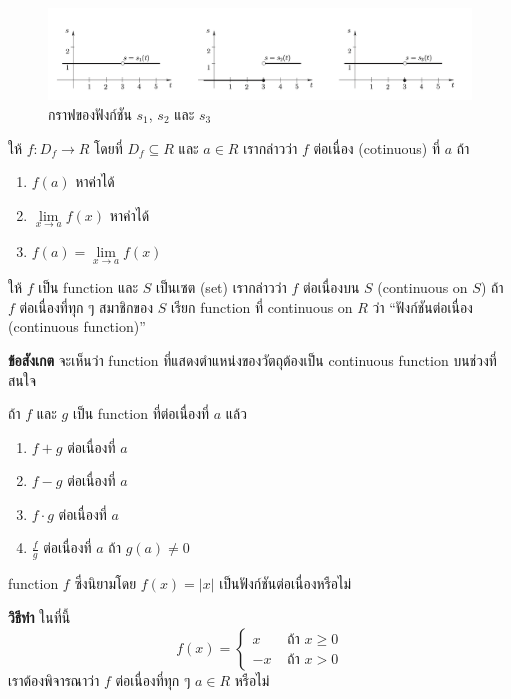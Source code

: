 \documentclass[
]{book}
\begin{document}
\begin{figure}

{\centering \includegraphics[width=0.5\linewidth]{images/fig-continuity-1} 

}

\caption{กราฟของฟังก์ชัน $s_1$, $s_2$ และ $s_3$}\label{fig:fig-continuity-1}
\end{figure}

ให้ \(f:D_{f}\rightarrow R\) โดยที่ \(D_{f}\subseteq R\) และ \(a\in R\)
เรากล่าวว่า \(f\) ต่อเนื่อง (cotinuous) ที่ \(a\) ถ้า

\begin{enumerate}
\def\labelenumi{\arabic{enumi}.}
\item
  \(f \left( a\right)\) หาค่าได้
\item
  \(\underset{x\rightarrow a}{\lim}f(x)\) หาค่าได้
\item
  \(f\left( a\right) =\underset{x\rightarrow a}{\lim}f(x)\)
\end{enumerate}

ให้ \(f\) เป็น function และ \(S\) เป็นเซต (set) เรากล่าวว่า \(f\) ต่อเนื่องบน
\(S\) (continuous on \(S\)) ถ้า \(f\) ต่อเนื่องที่ทุก ๆ สมาชิกของ \(S\) เรียก
function ที่ continuous on \(R\) ว่า ``ฟังก์ชันต่อเนื่อง (continuous function)''

\textbf{ข้อสังเกต} จะเห็นว่า function ที่แสดงตำแหน่งของวัตถุต้องเป็น continuous
function บนช่วงที่สนใจ

\label{thm-cont-1}
ถ้า \(f\) และ \(g\) เป็น function ที่ต่อเนื่องที่ \(a\) แล้ว

\begin{enumerate}
\def\labelenumi{\arabic{enumi}.}
\item
  \(f+g\) ต่อเนื่องที่ \(a\)
\item
  \(f-g\) ต่อเนื่องที่ \(a\)
\item
  \(f\cdot g\) ต่อเนื่องที่ \(a\)
\item
  \(\frac{f}{g}\) ต่อเนื่องที่ \(a\) ถ้า \(g\left( a\right) \neq 0\)
\end{enumerate}

\label{ex-cont-1}
function \(f\) ซึ่งนิยามโดย \(f\left( x\right) =\left| x\right|\)
เป็นฟังก์ชันต่อเนื่องหรือไม่

\textbf{วิธีทำ} ในที่นี้ \[f\left( x\right) =
             \begin{cases}
            x & \text{ ถ้า } x \ge 0 \\
            -x  & \text{ ถ้า } x>0
              \end{cases}\] เราต้องพิจารณาว่า \(f\) ต่อเนื่องที่ทุก ๆ \(a\in R\)
หรือไม่
\end{document}

